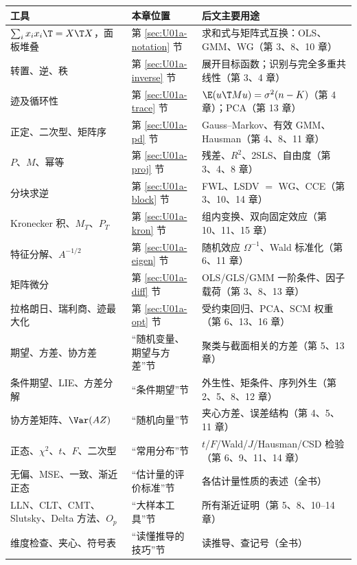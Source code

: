 \begin{center}
\small
\begin{tabularx}{\linewidth}{>{\raggedright\arraybackslash}p{3.9cm}>{\raggedright\arraybackslash}p{3.3cm}L}
\toprule
工具 & 本章位置 & 后文主要用途\\
\midrule
$\sum_i x_ix_i\T=X\T X$，面板堆叠 & 第 \ref{sec:U01a-notation} 节 & 求和式与矩阵式互换：OLS、GMM、WG（第 3、8、10 章）\\
转置、逆、秩 & 第 \ref{sec:U01a-inverse} 节 & 展开目标函数；识别与完全多重共线性（第 3、4 章）\\
迹及循环性 & 第 \ref{sec:U01a-trace} 节 & $\E(u\T Mu)=\sigma^2(n-K)$（第 4 章）；PCA（第 13 章）\\
正定、二次型、矩阵序 & 第 \ref{sec:U01a-pd} 节 & Gauss--Markov、有效 GMM、Hausman（第 4、8、11 章）\\
$P$、$M$、幂等 & 第 \ref{sec:U01a-proj} 节 & 残差、$R^2$、2SLS、自由度（第 3、4、8 章）\\
分块求逆 & 第 \ref{sec:U01a-block} 节 & FWL、LSDV $=$ WG、CCE（第 3、10、14 章）\\
Kronecker 积、$M_T$、$P_T$ & 第 \ref{sec:U01a-kron} 节 & 组内变换、双向固定效应（第 10、11、15 章）\\
特征分解、$A^{-1/2}$ & 第 \ref{sec:U01a-eigen} 节 & 随机效应 $\Omega^{-1}$、Wald 标准化（第 6、11 章）\\
矩阵微分 & 第 \ref{sec:U01a-diff} 节 & OLS/GLS/GMM 一阶条件、因子载荷（第 3、8、13 章）\\
拉格朗日、瑞利商、迹最大化 & 第 \ref{sec:U01a-opt} 节 & 受约束回归、PCA、SCM 权重（第 6、13、16 章）\\
期望、方差、协方差 & “随机变量、期望与方差”节 & 聚类与截面相关的方差（第 5、13 章）\\
条件期望、LIE、方差分解 & “条件期望”节 & 外生性、矩条件、序列外生（第 2、5、8、12 章）\\
协方差矩阵、$\Var(AZ)$ & “随机向量”节 & 夹心方差、误差结构（第 4、5、11 章）\\
正态、$\chi^2$、$t$、$F$、二次型 & “常用分布”节 & $t$/$F$/Wald/$J$/Hausman/CSD 检验（第 6、9、11、14 章）\\
无偏、MSE、一致、渐近正态 & “估计量的评价标准”节 & 各估计量性质的表述（全书）\\
LLN、CLT、CMT、Slutsky、Delta 方法、$O_p$ & “大样本工具”节 & 所有渐近证明（第 5、8、10--14 章）\\
维度检查、夹心、符号表 & “读懂推导的技巧”节 & 读推导、查记号（全书）\\
\bottomrule
\end{tabularx}
\end{center}

